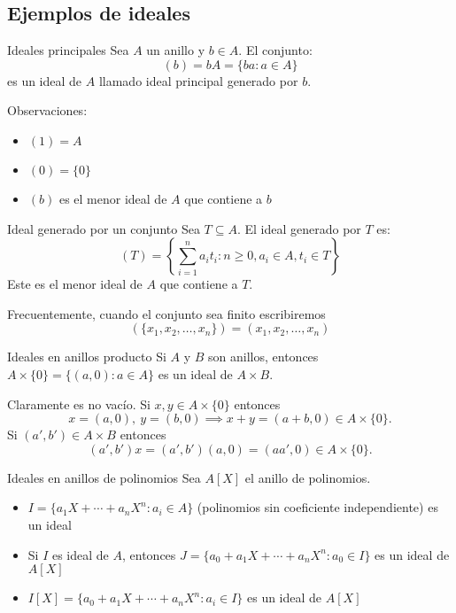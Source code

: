 \subsection{Ejemplos de ideales}

\begin{example}{Ideales principales}{}
    Sea \(A\) un anillo y \(b \in A\). El conjunto:
    \[
    (b) = bA = \{ba : a \in A\}
    \]
    es un ideal de \(A\) llamado {ideal principal generado por \(b\)}.
    
    Observaciones:
    \begin{itemize}
        \item \((1) = A\)
        \item \((0) = \{0\}\)
        \item \((b)\) es el menor ideal de \(A\) que contiene a \(b\)
    \end{itemize}
\end{example}

\begin{example}{Ideal generado por un conjunto}{}
    Sea \(T \subseteq A\). El {ideal generado por \(T\)} es:
    \[
    (T) = \left\{\sum_{i=1}^n a_i t_i : n \geq 0, a_i \in A, t_i \in T\right\}
    \]
    Este es el menor ideal de \(A\) que contiene a \(T\).
\end{example}

\begin{remark}
    Frecuentemente, cuando el conjunto sea finito escribiremos
    \[
    (\{x_1, x_2,\dots, x_n\}) = (x_1, x_2, \dots, x_n)
    \]
\end{remark}

\begin{example}{Ideales en anillos producto}{}
    Si \(A\) y \(B\) son anillos, entonces \(A \times \{0\} = \{(a, 0) : a \in A\}\) es un ideal de \(A \times B\).
\end{example}

\begin{proofbox}
    Claramente es no vacío. Si $x,y \in A \times \{0\}$ entonces 
    \[
    x = (a,0),\ y = (b,0) \implies x + y = (a+b, 0) \in A \times \{0\}.
    \]
    Si $(a',b') \in A \times B$ entonces 
    \[
    (a',b')x = (a',b')(a,0) = (aa',0) \in A \times \{0\}.
    \]
\end{proofbox}

\begin{example}{Ideales en anillos de polinomios}{}
    Sea \(A[X]\) el anillo de polinomios.
    \begin{itemize}
        \item \(I = \{a_1X + \cdots + a_nX^n : a_i \in A\}\) (polinomios sin coeficiente independiente) es un ideal
        \item Si \(I\) es ideal de \(A\), entonces \(J = \{a_0 + a_1X + \cdots + a_nX^n : a_0 \in I\}\) es un ideal de \(A[X]\)
        \item \(I[X] = \{a_0 + a_1X + \cdots + a_nX^n : a_i \in I\}\) es un ideal de \(A[X]\)
    \end{itemize}
\end{example}

